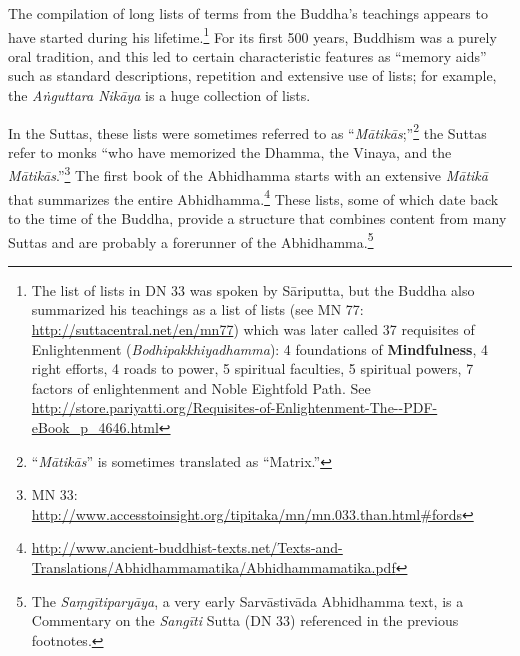 The compilation of long lists of terms from the Buddha’s teachings appears to have started during his lifetime.\footnote{The list of lists in DN 33 was spoken by Sāriputta, but the Buddha also summarized his teachings as a list of lists (see MN 77: \url{http://suttacentral.net/en/mn77}) which was later called 37 requisites of Enlightenment (\textit{Bodhipakkhiyadhamma}): 4 foundations of \textbf{Mindfulness}, 4 right efforts, 4 roads to power, 5 spiritual faculties, 5 spiritual powers, 7 factors of enlightenment and Noble Eightfold Path. See \url{http://store.pariyatti.org/Requisites-of-Enlightenment-The--PDF-eBook_p_4646.html}} For its first 500 years, Buddhism was a purely oral tradition, and this led to certain characteristic features as “memory aids” such as standard descriptions, repetition and extensive use of lists; for example, the \textit{Aṅguttara Nikāya} is a huge collection of lists. 

In the Suttas, these lists were sometimes referred to as “\textit{Mātikās};”\footnote{“\textit{Mātikās}” is sometimes translated as “Matrix.”} the Suttas refer to monks “who have memorized the Dhamma, the Vinaya, and the \textit{Mātikās}.”\footnote{MN 33: \url{http://www.accesstoinsight.org/tipitaka/mn/mn.033.than.html\#fords}} The first book of the Abhidhamma starts with an extensive \textit{Mātikā} that summarizes the entire Abhidhamma.\footnote{\url{http://www.ancient-buddhist-texts.net/Texts-and-Translations/Abhidhammamatika/Abhidhammamatika.pdf}} These lists, some of which date back to the time of the Buddha, provide a structure that combines content from many Suttas and are probably a forerunner of the Abhidhamma.\footnote{The \textit{Saṃgītiparyāya}, a very early Sarvāstivāda Abhidhamma text, is a Commentary on the \textit{Sangīti} Sutta (DN 33) referenced in the previous footnotes.}

